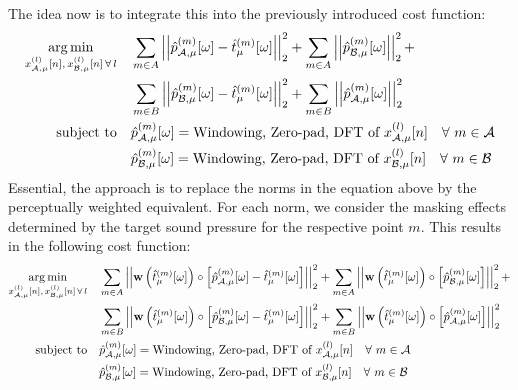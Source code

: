 The idea now is to integrate this into the previously introduced cost function:
\begin{equation}
    \begin{align}
        \argmin{x_{\za,\mu}^{(l)}[n],\,x_{\zb,\mu}^{(l)}[n]\,\forall\,l}{
           &\sum_{m\in A} \norm[2][2]{\hat{p}_{\za,\mu}^{(m)}[\omega] - \hat{t}_\mu^{(m)}[\omega]} +
            \sum_{m\in A} \norm[2][2]{\hat{p}_{\zb,\mu}^{(m)}[\omega]} + \\
           &\sum_{m\in B} \norm[2][2]{\hat{p}_{\zb,\mu}^{(m)}[\omega] - \hat{t}_\mu^{(m)}[\omega]} + 
            \sum_{m\in B} \norm[2][2]{\hat{p}_{\za,\mu}^{(m)}[\omega]}
        }\\
        \subjectto{
           &\hat{p}_{\za,\mu}^{(m)}[\omega] = \text{Windowing, Zero-pad, DFT of } x_{\za,\mu}^{(l)}[n]\quad\forall\ m\in\za \\
           &\hat{p}_{\zb,\mu}^{(m)}[\omega] = \text{Windowing, Zero-pad, DFT of } x_{\zb,\mu}^{(l)}[n]\quad\forall\ m\in\zb 
       }
    \end{align}
\end{equation}
Essential, the approach is to replace the norms in the equation above by the perceptually weighted equivalent.
For each norm, we consider the masking effects determined by the target sound pressure for the respective point $m$. 
This results in the following cost function:
\begin{equation}
    \begin{align}
        \argmin{x_{\za,\mu}^{(l)}[n],\,x_{\zb,\mu}^{(l)}[n]\,\forall\,l}{
           &\sum_{m\in A} \norm[2][2]{\vec{w}\left(\hat{t}_\mu^{(m)}[\omega]\right) \circ \left[\hat{p}_{\za,\mu}^{(m)}[\omega] - \hat{t}_\mu^{(m)}[\omega]\right]} +
            \sum_{m\in A} \norm[2][2]{\vec{w}\left(\hat{t}_\mu^{(m)}[\omega]\right) \circ \left[\hat{p}_{\zb,\mu}^{(m)}[\omega]\right]} + \\
           &\sum_{m\in B} \norm[2][2]{\vec{w}\left(\hat{t}_\mu^{(m)}[\omega]\right) \circ \left[\hat{p}_{\zb,\mu}^{(m)}[\omega] - \hat{t}_\mu^{(m)}[\omega]\right]} + 
            \sum_{m\in B} \norm[2][2]{\vec{w}\left(\hat{t}_\mu^{(m)}[\omega]\right) \circ \left[\hat{p}_{\za,\mu}^{(m)}[\omega]\right]}
        }\\
        \subjectto{
           &\hat{p}_{\za,\mu}^{(m)}[\omega] = \text{Windowing, Zero-pad, DFT of } x_{\za,\mu}^{(l)}[n]\quad\forall\ m\in\za \\
           &\hat{p}_{\zb,\mu}^{(m)}[\omega] = \text{Windowing, Zero-pad, DFT of } x_{\zb,\mu}^{(l)}[n]\quad\forall\ m\in\zb 
       }
    \end{align}
\end{equation}
